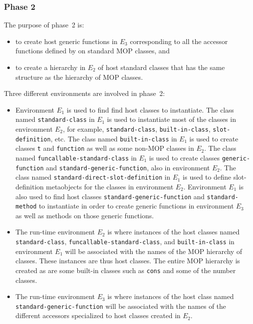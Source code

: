 \subsubsection{Phase 2}

The purpose of phase~2 is:

\begin{itemize}
\item to create host generic functions in $E_3$ corresponding to all
  the accessor functions defined by \sysname{} on standard MOP
  classes, and
\item to create a hierarchy in $E_2$ of host standard classes that has
  the same structure as the hierarchy of MOP classes.
\end{itemize}


Three different environments are involved in phase~2:

\begin{itemize}
\item Environment $E_1$ is used to find find host classes to
  instantiate.  The class named \texttt{standard-class} in $E_1$ is
  used to instantiate most of the classes in environment $E_2$, for
  example, \texttt{standard-class}, \texttt{built-in-class},
  \texttt{slot-definition}, etc.  The class named
  \texttt{built-in-class} in $E_1$ is used to create classes
  \texttt{t} and \texttt{function} as well as some non-MOP classes in
  $E_2$.  The class named \texttt{funcallable-standard-class} in $E_1$
  is used to create classes \texttt{generic-function} and
  \texttt{standard-generic-function}, also in environment $E_2$.  The
  class named \texttt{standard-direct-slot-definition} in $E_1$ is
  used to define slot-definition metaobjects for the classes in
  environment $E_2$.  Environment $E_1$ is also used to find host
  classes \texttt{standard-generic-function} and
  \texttt{standard-method} to instantiate in order to create generic
  functions in environment $E_3$ as well as methods on those generic
  functions.
\item The run-time environment $E_2$ is where instances of the host
  classes named \texttt{standard-class},
  \texttt{funcallable-standard-class}, and \texttt{built-in-class} in
  environment $E_1$ will be associated with the names of the MOP
  hierarchy of classes.  These instances are thus host classes.  The
  entire MOP hierarchy is created as are some built-in classes such as
  \texttt{cons} and some of the number classes.
\item The run-time environment $E_3$ is where instances of the host
  class named \texttt{standard-generic-function} will be associated
  with the names of the different accessors specialized to host
  classes created in $E_2$.
\end{itemize}

